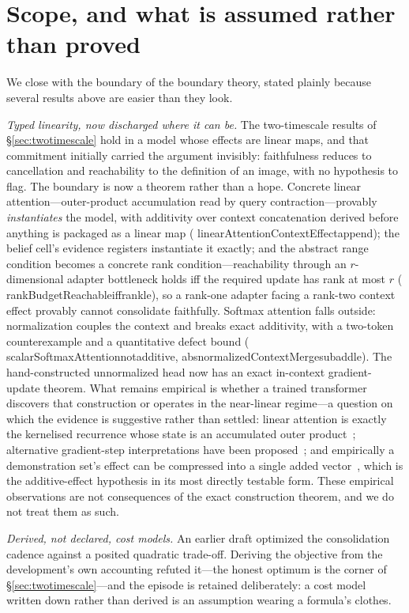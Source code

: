 \documentclass[11pt]{article}
\newcommand{\leanname}[1]{{\scriptsize\ttfamily
  \def\_{\textunderscore\allowbreak}#1}}
\begin{document}
\section{Scope, and what is assumed rather than proved}
\label{sec:scope}

We close with the boundary of the boundary theory, stated plainly because several results
above are easier than they look.

\emph{Typed linearity, now discharged where it can be.} The two-timescale results of
\S\ref{sec:twotimescale} hold in a model whose effects are linear maps, and that
commitment initially carried the argument invisibly: faithfulness reduces to cancellation
and reachability to the definition of an image, with no hypothesis to flag. The boundary
is now a theorem rather than a hope. Concrete linear attention---outer-product
accumulation read by query contraction---provably \emph{instantiates} the model, with
additivity over context concatenation derived before anything is packaged as a linear map
(\leanname{linearAttentionContextEffect\_append}); the belief cell's evidence registers
instantiate it exactly; and the abstract range condition becomes a concrete rank
condition---reachability through an $r$-dimensional adapter bottleneck holds iff the
required update has rank at most $r$
(\leanname{rankBudgetReachable\_iff\_rank\_le}), so a rank-one adapter facing a rank-two
context effect provably cannot consolidate faithfully. Softmax attention falls outside:
normalization couples the context and breaks exact additivity, with a two-token
counterexample and a quantitative defect bound
(\leanname{scalarSoftmaxAttention\_not\_additive},
\leanname{abs\_normalizedContextMerge\_sub\_add\_le}). The hand-constructed
unnormalized head now has an exact in-context gradient-update theorem. What remains
empirical is whether a trained transformer discovers that construction or operates in
the near-linear regime---a question on which the evidence is suggestive rather than
settled: linear attention is exactly the kernelised recurrence whose state is an
accumulated outer product~\cite{katharopoulos2020}; alternative gradient-step
interpretations have been proposed~\cite{dai2022}; and empirically a demonstration
set's effect can be compressed into a single added vector~\cite{hendel2023,todd2023},
which is the additive-effect hypothesis in its most directly testable form. These
empirical observations are not consequences of the exact construction theorem, and we
do not treat them as such.

\emph{Derived, not declared, cost models.} An earlier draft optimized the consolidation
cadence against a posited quadratic trade-off. Deriving the objective from the
development's own accounting refuted it---the honest optimum is the corner of
\S\ref{sec:twotimescale}---and the episode is retained deliberately: a cost model written
down rather than derived is an assumption wearing a formula's clothes.
\end{document}
